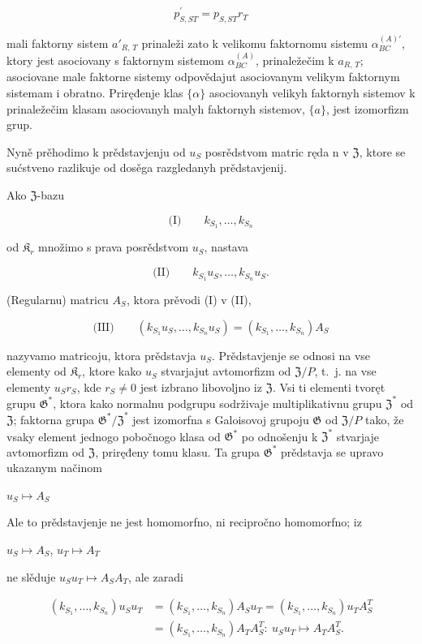 \documentclass[11pt]{article}
\begin{document}
\[p_{S,ST}^{\prime}=p_{S,ST}r_{T}\]

mali faktorny sistem \(a'_{R,\,T}\) prinaleži zato k velikomu faktornomu sistemu \(\alpha^{(A)\prime}_{BC}\), ktory jest asociovany s faktornym sistemom \(\alpha^{(A)}_{BC}\), prinaležečim k \(a_{R,\,T}\); asociovane male faktorne sistemy odpovědajut asociovanym velikym faktornym sistemam i obratno. Priręđenje klas \(\{\alpha\}\) asociovanyh velikyh faktornyh sistemov k prinaležečim klasam asociovanyh malyh faktornyh sistemov, \(\{a\}\), jest izomorfizm grup.

Nyně prěhodimo k prědstavjenju od \(u_S\) posrědstvom matric ręda n v \(\mathfrak{Z}\), ktore se sućstveno razlikuje od dosěga razgledanyh prědstavjenij.

Ako \(\mathfrak Z\)-bazu

\[
\text{(I)}\qquad k_{S_1}, \ldots, k_{S_n}
\]

od \(\mathfrak K_r\) množimo s prava posrědstvom \(u_S\), nastava

\[
\text{(II)}\qquad k_{S_1}u_S, \ldots, k_{S_n}u_S.
\]

(Regularnu) matricu \(A_S\), ktora prěvodi (I) v (II),

\[
\text{(III)}\qquad (k_{S_1}u_S, \ldots, k_{S_n}u_S) = (k_{S_1}, \ldots, k_{S_n})A_S
\]

nazyvamo matricoju, ktora prědstavja \(u_S\). Prědstavjenje se odnosi na vse elementy od \(\mathfrak K_{r}\), ktore kako \(u_S\) stvarjajut avtomorfizm od \(\mathfrak Z/P\), t.~j. na vse elementy \(u_Sr_S\), kde \(r_S \neq 0\) jest izbrano libovoljno iz \(\mathfrak Z\). Vsi ti elementi tvoręt grupu \(\mathfrak G^*\), ktora kako normalnu podgrupu sodrživaje multiplikativnu grupu \(\mathfrak Z^*\) od \(\mathfrak Z\); faktorna grupa \(\mathfrak G^*/\mathfrak Z^*\) jest izomorfna s Galoisovoj grupoju \(\mathfrak G\) od \(\mathfrak Z/P\) tako, že vsaky element jednogo pobočnogo klasa od \(\mathfrak G^*\) po odnošenju k \(\mathfrak Z^*\) stvarjaje avtomorfizm od \(\mathfrak Z\), priręđeny tomu klasu. Ta grupa \(\mathfrak G^*\) prědstavja se upravo ukazanym načinom

\(u_S \mapsto A_S\)

Ale to prědstavjenje ne jest homomorfno, ni recipročno homomorfno; iz

\(u_S \mapsto A_S\), \(u_T \mapsto A_T\)

ne slěduje \(u_Su_T \mapsto A_SA_T\), ale zaradi

\[
\begin{aligned}
(k_{S_1}, \ldots, k_{S_n})u_Su_T
&=(k_{S_1}, \ldots, k_{S_n})A_Su_T
=(k_{S_1}, \ldots, k_{S_n})u_TA_S^T\\
&=(k_{S_1}, \ldots, k_{S_n})A_TA_S^T:\ u_Su_T\mapsto A_TA_S^T.
\end{aligned}
\]
\end{document}
